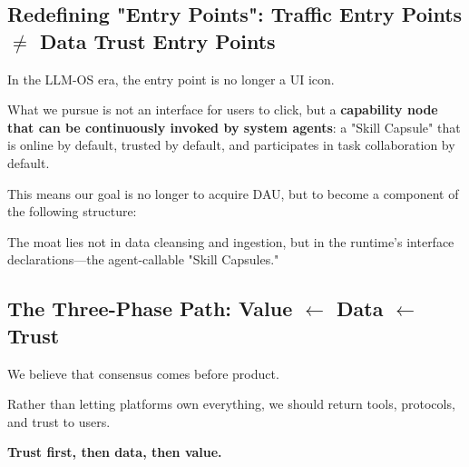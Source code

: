 \newpage
\subsection*{Redefining "Entry Points": Traffic Entry Points $\neq$ Data Trust Entry Points}

In the LLM-OS era, the entry point is no longer a UI icon.

What we pursue is not an interface for users to click, but a \textbf{capability node that can be continuously invoked by system agents}:
a "Skill Capsule" that is online by default, trusted by default, and participates in task collaboration by default.

This means our goal is no longer to acquire DAU, but to become a component of the following structure:



The moat lies not in data cleansing and ingestion, but in the runtime's interface declarations---the agent-callable "Skill Capsules."


\subsection*{The Three-Phase Path: Value $\leftarrow$ Data $\leftarrow$ Trust}

We believe that consensus comes before product.

Rather than letting platforms own everything, we should return tools, protocols, and trust to users.

\textbf{Trust first, then data, then value.}

